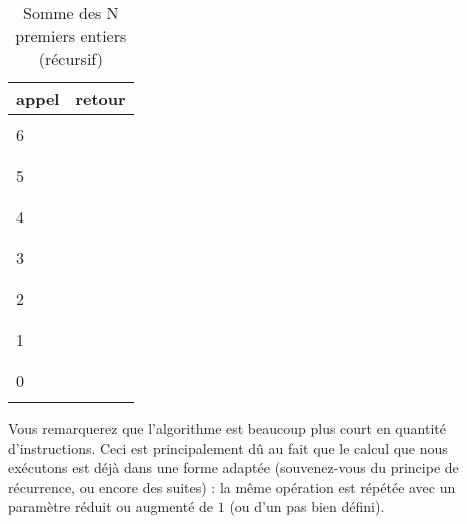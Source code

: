 \documentclass[11pt,a4paper]{article}
\begin{document}
\begin{table}[h!]
\begin{minipage}{0.17\textwidth}
  \end{minipage}
  \hfillx
  \begin{minipage}{0.17\textwidth}
    \centering
    \begin{tabular}{|C{1cm}|C{1cm}|}
        \hline
        appel &  retour  \\
        \hline
              &     \\
        6     &     \\
              &     \\
        \hline
              &     \\
        5     &     \\
              &     \\
        \hline
              &     \\
        4     &     \\
              &     \\
        \hline
              &     \\
        3     &     \\
              &     \\
        \hline
              &     \\
        2     &     \\
              &     \\
        \hline
              &     \\
        1     &     \\
              &     \\
        \hline
              &     \\
        0     &     \\
              &     \\
        \hline
    \end{tabular}
  \end{minipage}
  \caption{Somme des N premiers entiers (récursif)}
  \label{somme-n-premiers-entiers-recursif}
\end{table}


\bigskip

Vous remarquerez que l'algorithme est beaucoup plus court en quantité d'instructions.
Ceci est principalement dû au fait que le calcul que nous exécutons est déjà dans une forme adaptée (souvenez-vous du principe de récurrence, ou encore des suites) : la même opération est répétée avec un paramètre réduit ou augmenté de $ 1 $ (ou d'un pas bien défini).
\end{document}
